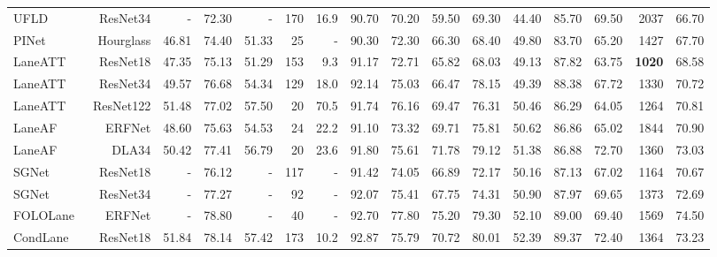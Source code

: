 \begin{table*}
\begin{center}
{\begin{tabular}{@{}lrrrrrrrrrrrrrrr@{}}
                UFLD~\cite{qin2020ultra} & ResNet34 & - & 72.30 & - & 170 & 16.9 & 90.70 & 70.20 & 59.50 & 69.30 & 44.40 & 85.70 & 69.50 & 2037 & 66.70 \\
                
                PINet~\cite{ko2021key} & Hourglass & 46.81 & 74.40 & 51.33 & 25 & - & 90.30 & 72.30 & 66.30 & 68.40 & 49.80 & 83.70 & 65.20 & 1427 & 67.70 \\

                LaneATT~\cite{tabelini2021keep} & ResNet18 & 47.35 & 75.13 & 51.29 & 153 & 9.3 & 91.17 & 72.71 & 65.82 & 68.03 & 49.13 & 87.82 & 63.75 & \textbf{1020} & 68.58 \\

                LaneATT~\cite{tabelini2021keep} & ResNet34 & 49.57 & 76.68 & 54.34 & 129 & 18.0 & 92.14 & 75.03 & 66.47 & 78.15 & 49.39 & 88.38 & 67.72 & 1330 & 70.72 \\

                LaneATT~\cite{tabelini2021keep} & ResNet122 & 51.48 & 77.02 & 57.50 & 20 & 70.5 & 91.74 & 76.16 & 69.47 & 76.31 & 50.46 & 86.29 & 64.05 & 1264 & 70.81 \\
                
                LaneAF~\cite{abualsaud2021laneaf} & ERFNet & 48.60 & 75.63 & 54.53 & 24 & 22.2 & 91.10 & 73.32 & 69.71 & 75.81 & 50.62 & 86.86 & 65.02 & 1844 & 70.90 \\
                
                LaneAF~\cite{abualsaud2021laneaf} & DLA34 & 50.42 & 77.41 & 56.79 & 20 & 23.6 & 91.80 & 75.61 & 71.78 & 79.12 & 51.38 & 86.88 & 72.70 & 1360 & 73.03 \\
                
                SGNet~\cite{su2021structure} & ResNet18 & - & 76.12 & - & 117 & - & 91.42 & 74.05 & 66.89 & 72.17 & 50.16 & 87.13 & 67.02 & 1164 & 70.67 \\
                
                SGNet~\cite{su2021structure} & ResNet34 & - & 77.27 & - & 92 & - & 92.07 & 75.41 & 67.75 & 74.31 & 50.90 & 87.97 & 69.65 & 1373 & 72.69 \\
                
                FOLOLane~\cite{qu2021focus} & ERFNet & - & 78.80 & - & 40 & - & 92.70 & 77.80 & 75.20 & 79.30 & 52.10 & 89.00 & 69.40 & 1569 & 74.50 \\
                
                CondLane~\cite{liu2021condlanenet} & ResNet18 & 51.84 & 78.14 & 57.42 & 173 & 10.2 & 92.87 & 75.79 & 70.72 & 80.01 & 52.39 & 89.37 & 72.40 & 1364 & 73.23 \\


\end{tabular}}
\end{center}
\end{table*}
